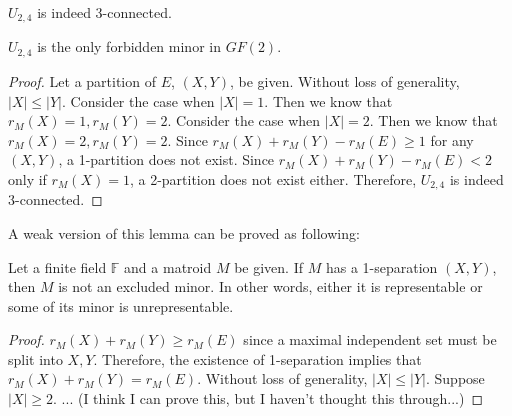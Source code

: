 \begin{thm}
$U_{2, 4}$ is indeed 3-connected.
\end{thm}
$U_{2, 4}$ is the only forbidden minor in $GF(2)$.
\begin{proof}
Let a partition of $E$, $(X, Y)$, be given.
Without loss of generality, $\lvert X \rvert \leq \lvert Y \rvert$.
Consider the case when $\lvert X \rvert = 1$.
Then we know that $r_M(X) = 1, r_M(Y) = 2$.
Consider the case when $\lvert X \rvert = 2$.
Then we know that $r_M(X) = 2, r_M(Y) = 2$.
Since $r_M(X) + r_M(Y) - r_M(E) \geq 1$ for any $(X, Y)$, a 1-partition does not exist.
Since $r_M(X) + r_M(Y) - r_M(E) < 2$ only if $r_M(X) = 1$, a 2-partition does not exist either.
Therefore, $U_{2, 4}$ is indeed 3-connected.
\end{proof}

A weak version of this lemma can be proved as following:

\begin{lem}
Let a finite field $\mathbb{F}$ and a matroid $M$ be given.
If $M$ has a 1-separation $(X, Y)$, then $M$ is not an excluded minor.
In other words, either it is representable or some of its minor is unrepresentable.
\end{lem}

\begin{proof}
$r_M(X) + r_M(Y) \geq r_M(E)$ since a maximal independent set must be split into $X, Y$.
Therefore, the existence of 1-separation implies that $r_M(X) + r_M(Y) = r_M(E)$.
Without loss of generality, $\lvert X \rvert \leq \lvert Y \rvert$.
Suppose $\lvert X \rvert \geq 2$.
... (I think I can prove this, but I haven't thought this through...)
\end{proof}

